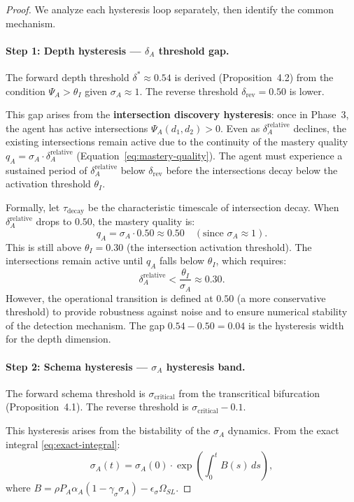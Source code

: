 \begin{proof}
We analyze each hysteresis loop separately, then identify the common
mechanism.

\paragraph{Step 1: Depth hysteresis — $\delta_A$ threshold gap.}
The forward depth threshold $\delta^* \approx 0.54$ is derived
(Proposition~4.2) from the condition $\Psi_A > \theta_I$ given
$\sigma_A \approx 1$. The reverse threshold $\delta_{\text{rev}} = 0.50$
is lower.

This gap arises from the \textbf{intersection discovery hysteresis}:
once in Phase~3, the agent has active intersections
$\Psi_A(d_1, d_2) > 0$. Even as $\delta_A^{\text{relative}}$ declines,
the existing intersections remain active due to the continuity of the
mastery quality $q_A = \sigma_A \cdot \delta_A^{\text{relative}}$
(Equation~\eqref{eq:mastery-quality}). The agent must experience a
sustained period of $\delta_A^{\text{relative}}$ below
$\delta_{\text{rev}}$ before the intersections decay below the
activation threshold $\theta_I$.

Formally, let $\tau_{\text{decay}}$ be the characteristic timescale
of intersection decay. When $\delta_A^{\text{relative}}$ drops to
$0.50$, the mastery quality is:
\[
q_A = \sigma_A \cdot 0.50 \approx 0.50 \quad (\text{since } \sigma_A \approx 1).
\]
This is still above $\theta_I = 0.30$ (the intersection activation
threshold). The intersections remain active until $q_A$ falls below
$\theta_I$, which requires:
\[
\delta_A^{\text{relative}} < \frac{\theta_I}{\sigma_A} \approx 0.30.
\]
However, the operational transition is defined at $0.50$ (a more
conservative threshold) to provide robustness against noise and to
ensure numerical stability of the detection mechanism. The gap
$0.54 - 0.50 = 0.04$ is the hysteresis width for the depth dimension.

\paragraph{Step 2: Schema hysteresis — $\sigma_A$ hysteresis band.}
The forward schema threshold is $\sigma_{\text{critical}}$ from the
transcritical bifurcation (Proposition~4.1). The reverse threshold is
$\sigma_{\text{critical}} - 0.1$.

This hysteresis arises from the bistability of the $\sigma_A$ dynamics.
From the exact integral \eqref{eq:exact-integral}:
\[
\sigma_A(t) = \sigma_A(0) \cdot \exp\!\left( \int_0^t B(s) \, ds \right),
\]
where $B = \rho P_A \alpha_A (1 - \gamma_\sigma \sigma_A) - \epsilon_\sigma \Omega_{SL}$.


\end{proof}
